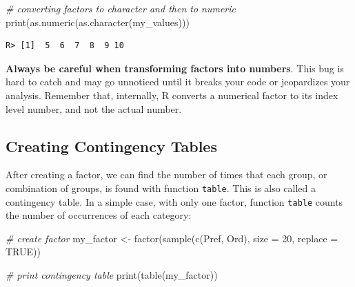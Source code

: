 \documentclass[
  12pt,
]{book}
\newenvironment{Shaded}{\begin{snugshade}}{\end{snugshade}}
\newcommand{\AttributeTok}[1]{\textcolor[rgb]{0.61,0.61,0.61}{#1}}
\newcommand{\CommentTok}[1]{\textcolor[rgb]{0.37,0.37,0.37}{\textit{#1}}}
\newcommand{\ConstantTok}[1]{\textcolor[rgb]{0,0,0}{#1}}
\newcommand{\DecValTok}[1]{\textcolor[rgb]{0.06,0.06,0.06}{#1}}
\newcommand{\FunctionTok}[1]{\textcolor[rgb]{0,0,0}{#1}}
\newcommand{\NormalTok}[1]{#1}
\newcommand{\OtherTok}[1]{\textcolor[rgb]{0.37,0.37,0.37}{#1}}
\newcommand{\StringTok}[1]{\textcolor[rgb]{0.5,0.5,0.5}{#1}}
\newenvironment{rmdcaution}
{\begin{cautionblock}
		
	} {\end{cautionblock}}
\begin{document}
\begin{Shaded}
\begin{Highlighting}[]
\CommentTok{\# converting factors to character and then to numeric}
\FunctionTok{print}\NormalTok{(}\FunctionTok{as.numeric}\NormalTok{(}\FunctionTok{as.character}\NormalTok{(my\_values)))}
\end{Highlighting}
\end{Shaded}

\begin{verbatim}
R> [1]  5  6  7  8  9 10
\end{verbatim}

\begin{rmdcaution}
\textbf{Always be careful when transforming factors into numbers}. This
bug is hard to catch and may go unnoticed until it breaks your code or
jeopardizes your analysis. Remember that, internally, R converts a
numerical factor to its index level number, and not the actual number.
\end{rmdcaution}

\hypertarget{creating-contingency-tables}{%
\subsection{Creating Contingency Tables}\label{creating-contingency-tables}}

After creating a factor, we can find the number of times that each group, or combination of groups, is found with function \texttt{table}. This is also called a contingency table. In a simple case, with only one factor, function \texttt{table} counts the number of occurrences of each category: 

\begin{Shaded}
\begin{Highlighting}[]
\CommentTok{\# create factor}
\NormalTok{my\_factor }\OtherTok{\textless{}{-}} \FunctionTok{factor}\NormalTok{(}\FunctionTok{sample}\NormalTok{(}\FunctionTok{c}\NormalTok{(}\StringTok{\textquotesingle{}Pref\textquotesingle{}}\NormalTok{, }\StringTok{\textquotesingle{}Ord\textquotesingle{}}\NormalTok{),}
                           \AttributeTok{size =} \DecValTok{20}\NormalTok{,}
                           \AttributeTok{replace =} \ConstantTok{TRUE}\NormalTok{))}

\CommentTok{\# print contingency table}
\FunctionTok{print}\NormalTok{(}\FunctionTok{table}\NormalTok{(my\_factor))}
\end{Highlighting}
\end{Shaded}
\end{document}
